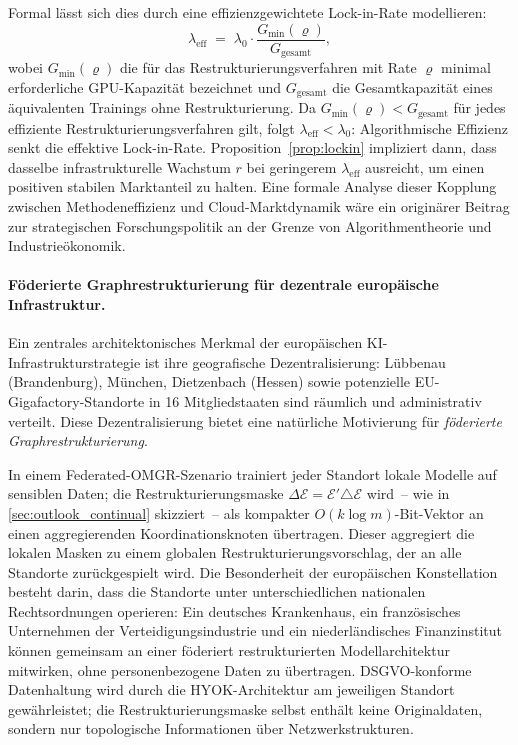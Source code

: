 \documentclass[12pt, a4paper, openany]{report}
\newcommand{\calE}{\mathcal{E}}
\begin{document}
Formal lässt sich dies durch eine effizienzgewichtete Lock-in-Rate
modellieren:
\[
  \lambda_{\mathrm{eff}}
  \;=\; \lambda_0 \cdot \frac{G_{\min}(\varrho)}{G_{\mathrm{gesamt}}},
\]
wobei $G_{\min}(\varrho)$ die für das Restrukturierungsverfahren mit
Rate $\varrho$ minimal erforderliche GPU-Kapazität bezeichnet und
$G_{\mathrm{gesamt}}$ die Gesamtkapazität eines äquivalenten Trainings
ohne Restrukturierung.  Da $G_{\min}(\varrho) < G_{\mathrm{gesamt}}$
für jedes effiziente Restrukturierungsverfahren gilt, folgt
$\lambda_{\mathrm{eff}} < \lambda_0$: Algorithmische Effizienz senkt
die effektive Lock-in-Rate.  Proposition~\ref{prop:lockin} impliziert
dann, dass dasselbe infrastrukturelle Wachstum $r$ bei geringerem
$\lambda_{\mathrm{eff}}$ ausreicht, um einen positiven stabilen
Marktanteil zu halten.  Eine formale Analyse dieser Kopplung zwischen
Methodeneffizienz und Cloud-Marktdynamik wäre ein originärer Beitrag
zur strategischen Forschungspolitik an der Grenze von
Algorithmentheorie und Industrieökonomik.

\paragraph{Föderierte Graphrestrukturierung für dezentrale
  europäische Infrastruktur.}
Ein zentrales architektonisches Merkmal der europäischen
KI-Infrastrukturstrategie ist ihre geografische Dezentralisierung:
Lübbenau (Brandenburg), München, Dietzenbach (Hessen) sowie potenzielle
EU-Gigafactory-Standorte in 16 Mitgliedstaaten sind räumlich und
administrativ verteilt.  Diese Dezentralisierung bietet eine natürliche
Motivierung für \emph{föderierte Graphrestrukturierung}.

In einem Federated-OMGR-Szenario trainiert jeder Standort lokale
Modelle auf sensiblen Daten; die Restrukturierungsmaske
$\Delta\calE = \calE' \triangle \calE$ wird~-- wie in
\cref{sec:outlook_continual} skizziert~-- als kompakter
$O(k \log m)$-Bit-Vektor an einen aggregierenden Koordinationsknoten
übertragen.  Dieser aggregiert die lokalen Masken zu einem globalen
Restrukturierungsvorschlag, der an alle Standorte zurückgespielt wird.
Die Besonderheit der europäischen Konstellation besteht darin, dass
die Standorte unter unterschiedlichen nationalen Rechtsordnungen
operieren: Ein deutsches Krankenhaus, ein französisches Unternehmen der
Verteidigungsindustrie und ein niederländisches Finanzinstitut können
gemeinsam an einer föderiert restrukturierten Modellarchitektur
mitwirken, ohne personenbezogene Daten zu übertragen.
DSGVO-konforme Datenhaltung wird durch die HYOK-Architektur am
jeweiligen Standort gewährleistet; die Restrukturierungsmaske selbst
enthält keine Originaldaten, sondern nur topologische Informationen
über Netzwerkstrukturen.
\end{document}
